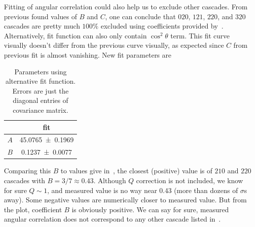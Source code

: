 Fitting of angular correlation could also help us to exclude other cascades. From previous found values of $B$ and $C$, one can conclude that $020$, $121$, $220$, and $320$ cascades are pretty much $100 \%$ excluded using coefficients provided by~\cite{deutsch}. Alternatively, fit function can also only contain $\cos^2\theta$ term. This fit curve visually doesn't differ from the previous curve visually, as expected since $C$ from previous fit is almost vanishing. New fit parameters are
\begin{table}[ht]
   \centering
   \begin{tabular}{cc}
      \toprule
   & fit  \\
      \midrule
      $A$ &\num{45.0765 +- 0.1969} \\
      $B$ & \num{0.1237 +- 0.0077} \\
      \bottomrule
   \end{tabular}
   \caption{Parameters using alternative fit function. Errors are just the diagonal entries of covariance matrix.}
   \label{tab:ABC}
\end{table}
Comparing this $B$ to values give in~\cite{deutsch}, the closest (positive) value is of $210$ and $220$ cascades with $B=3/7\approx\num{0.43}$. Although $Q$ correction is not included, we know for sure $Q \sim 1$, and measured value is no way near \num{0.43} (more than dozens of $\sigma$s away). Some negative values are numerically closer to measured value. But from the plot, coefficient $B$ is obviously positive. We can say for sure, measured angular correlation does not correspond to any other cascade listed in~\cite{deutsch}.
